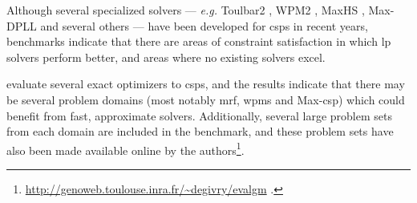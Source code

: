Although several specialized solvers --- \emph{e.g.} Toulbar2 \parencite{Allouche10}, WPM2 \parencite{Ansotegui13b}, MaxHS \parencite{Davies13}, Max-DPLL \parencite{Larrosa08} and several others --- have been developed for \glspl{csp} in recent years, benchmarks indicate that there are areas of constraint satisfaction in which \gls{lp} solvers perform better, and areas where no existing solvers excel.

\Textcites{Allouche14b}{deGivry14} evaluate several exact optimizers to \glspl{csp}, and the results indicate that there may be several problem domains (most notably \acrshort{mrf}, \acrshort{wpms} and Max-\acrshort{csp}) which could benefit from fast, approximate solvers.
Additionally, several large problem sets from each domain are included in the benchmark, and these problem sets have also been made available online by the authors\footnote{\url{http://genoweb.toulouse.inra.fr/~degivry/evalgm} \parencite[\pno~7]{Allouche14b}.}.
